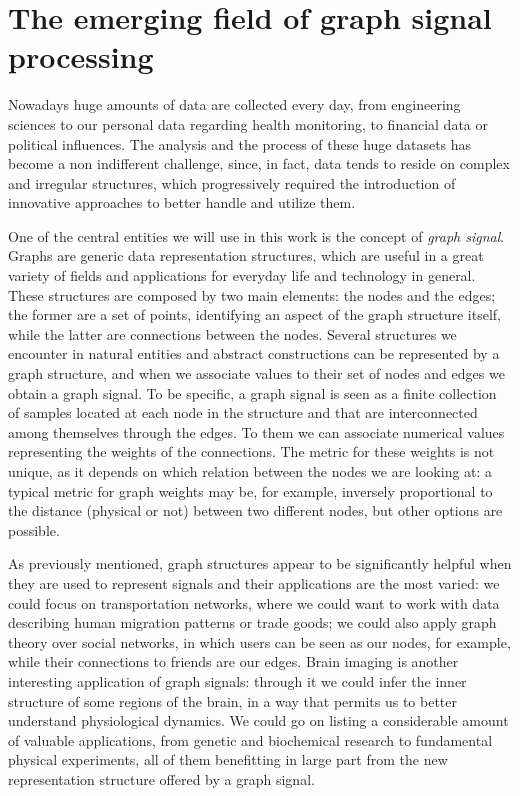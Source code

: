\chapter{The emerging field of graph signal processing}
\label{ch:introduction}
Nowadays huge amounts of data are collected every day, from engineering sciences to our personal data regarding health monitoring, to financial data or political influences. The analysis and the process of these huge datasets has become a non indifferent challenge, since, in fact, data tends to reside on complex and irregular structures, which progressively required the introduction of innovative approaches to better handle and utilize them. \cite{Ortega2017} \cite{Sandry}

One of the central entities we will use in this work is the concept of \textit{graph signal}.\\
Graphs are generic data representation structures, which are useful in a great variety of fields and applications for everyday life and technology in general. These structures are composed by two main elements: the nodes and the edges; the former are a set of points, identifying an aspect of the graph structure itself, while the latter are connections between the nodes. Several structures we encounter in natural entities and abstract constructions can be represented by a graph structure, and when we associate values to their set of nodes and edges we obtain a graph signal. To be specific, a graph signal is seen as a finite collection of samples located at each node in the structure and that are interconnected among themselves through the edges. To them we can associate numerical values representing the weights of the connections. The metric for these weights is not unique, as it depends on which relation between the nodes we are looking at: a typical metric for graph weights may be, for example, inversely proportional to the distance (physical or not) between two different nodes, but other options are possible.

As previously mentioned, graph structures appear to be significantly helpful when they are used to represent signals and their applications are the most varied: we could focus on transportation networks, where we could want to work with data describing human migration patterns or trade goods; we could also apply graph theory over social networks, in which users can be seen as our nodes, for example, while their connections to friends are our edges. \cite{Ortega2017} Brain imaging is another interesting application of graph signals: through it we could infer the inner structure of some regions of the brain, in a way that permits us to better understand physiological dynamics. \cite{Shuman2013} We could go on listing a considerable amount of valuable applications, from genetic and biochemical research to fundamental physical experiments, all of them benefitting in large part from the new representation structure offered by a graph signal.


